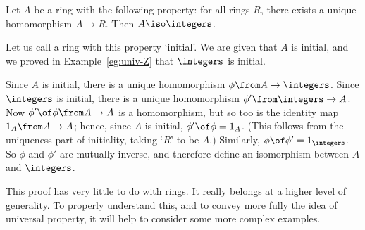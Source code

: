 \begin{ilemma}  
\label{lemma:Z-unique}
%
%
Let $A$ be a ring with the following property: for all rings $R$, there exists
a unique homomorphism $A \to R$.  Then $A \iso \integers$.
\end{ilemma}

\begin{pf}
Let us call a ring with this property `initial'.  We are given that $A$
is initial, and we proved in Example~\ref{eg:univ-Z} that $\integers$ is
initial.  

Since $A$ is initial, there is a unique homomorphism $\phi\from A \to
\integers$.  Since $\integers$ is initial, there is a unique homomorphism
$\phi'\from \integers \to A$.  Now $\phi' \of \phi \from A \to A$ is a
homomorphism, but so too is the identity map $1_A\from A \to A$; hence,
since $A$ is initial, $\phi' \of \phi = 1_A$.  (This follows from the
uniqueness part of initiality, taking `$R$' to be $A$.)  Similarly, $\phi
\of \phi' = 1_\integers$.  So $\phi$ and $\phi'$ are mutually inverse, and
therefore define an isomorphism between $A$ and $\integers$.
\end{pf}

This proof has very little to do with rings.  It really belongs at a higher
level of generality.  To properly understand this, and to convey more fully
the idea of universal property, it will help to consider some more
complex examples.


